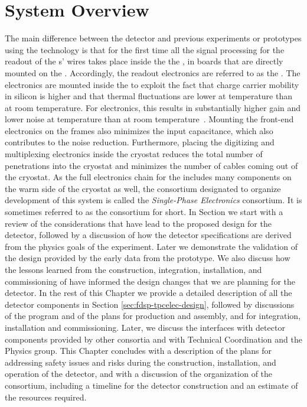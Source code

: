 \section{System Overview}
\label{sec:fdsp-tpcelec-overview}

The main difference between the   detector and 
previous experiments or prototypes using the  technology is
that for the first time all the signal processing for the readout of the
s' wires takes place inside the the , in boards that 
are directly mounted on the . Accordingly, the  
readout electronics are referred to as the . The electronics are 
mounted inside the  to exploit the fact that charge carrier 
mobility in silicon is higher and that thermal fluctuations are lower 
at  temperature than at room temperature. For  
electronics, this results in substantially higher gain and lower noise 
at  temperature than at room temperature~\cite{larCMOS}.  
Mounting the front-end electronics on the  frames also minimizes 
the input capacitance, which also contributes to the noise reduction.  
Furthermore, placing the digitizing and multiplexing electronics inside 
the cryostat reduces the total number of penetrations into the cryostat 
and minimizes the number of cables coming out of the cryostat.  
As the full  electronics chain for the  includes 
many components on the warm side of the cryostat as well, the  
consortium designated to organize development of this system is called 
the  \textit{Single-Phase  Electronics} consortium. 
It is sometimes referred to as the  consortium for short.
In Section we start with a review of the considerations that
have lead to the proposed design for the   detector,
followed by a discussion of how the detector specifications are derived
from the physics goals of the experiment. Later we demonstrate the 
validation of the design provided by the early data from the 
prototype. We also discuss how the lessons learned from the construction,
integration, installation, and commissioning of  have 
informed the design changes that we are planning for the 
 detector. In the rest of this Chapter we provide a detailed
description of all the  detector components in Section
\ref{sec:fdsp-tpcelec-design}, followed by discussions of the 
program and of the plans for production and assembly, and for integration,
installation and commissioning. Later, we discuss the interfaces with
detector components provided by other consortia and with Technical
Coordination and the Physics group. This Chapter concludes with a description
of the plans for addressing safety issues and risks during the
construction, installation, and operation of the detector, and with
a discussion of the organization of the  consortium,
including a timeline for the detector construction and an estimate
of the resources required.


